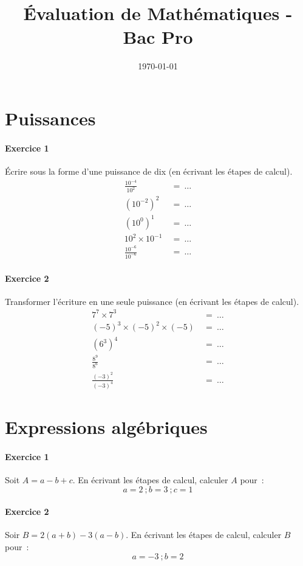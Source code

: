 \documentclass[a4paper]{article}
\begin{document}
  \title{Évaluation de Mathématiques - Bac Pro}
  \author{}
  \date{\today}
  \maketitle
  
  \section*{Puissances}
  \paragraph{Exercice 1}
  Écrire sous la forme d'une puissance de dix (en écrivant les étapes de calcul).
  \begin{align*}
    \frac{10^{-4}}{10^2} &\ = \ \dots\\
    (10^{-2})^2 &\ = \ \dots\\
    (10^0)^1 &\ = \ \dots\\
    10^2 \times 10^{-1} &\ = \ \dots\\
    \frac{10^{-6}}{10^{-6}} &\ = \ \dots
  \end{align*}

  \paragraph{Exercice 2}
  Transformer l'écriture en une seule puissance (en écrivant les étapes de calcul).
  \begin{align*}
    7^7 \times 7^3 &\ =\ \dots\\
    (-5)^3 \times (-5)^2 \times (-5) &\ =\ \dots\\
    (6^3)^4 &\ =\ \dots\\
    \frac{8^9}{8^6} &\ =\ \dots\\
    \frac{(-3)^2}{(-3)^4} &\ =\ \dots
  \end{align*}

  \section*{Expressions algébriques}
  \paragraph{Exercice 1}
  Soit $A = a - b + c$. En écrivant les étapes de calcul, calculer $A$ pour~:
  \[
    a = 2~; b = 3~; c = 1
  \]
  \vspace{2cm}

  \paragraph{Exercice 2}
  Soir $B = 2 (a + b) - 3 (a - b)$. En écrivant les étapes de calcul, calculer $B$ pour~:
  \[
    a = -3~; b = 2
  \]
  \vspace{2cm}
\end{document}
